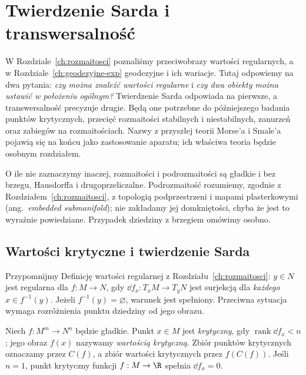 \chapter{Twierdzenie Sarda i transwersalność}
\label{ch:sard-transwersalnosc}

\providecommand{\atlasref}[2]{#2}

W Rozdziale~\ref{ch:rozmaitosci} poznaliśmy przeciwobrazy
wartości regularnych, a w Rozdziale~\ref{ch:geodezyjne-exp}
geodezyjne i ich wariacje. Tutaj odpowiemy na dwa pytania:
\emph{czy można znaleźć wartości regularne} i
\emph{czy dwa obiekty można ustawić w położeniu ogólnym?}
Twierdzenie Sarda odpowiada na pierwsze, a transwersalność
precyzuje drugie. Będą one potrzebne do późniejszego
badania punktów krytycznych, przecięć rozmaitości
stabilnych i niestabilnych, zanurzeń oraz zabiegów na
rozmaitościach. Nazwy z przyszłej teorii Morse'a i
Smale'a pojawią się na końcu jako zastosowanie aparatu;
ich właściwa teoria będzie osobnym rozdziałem.

O ile nie zaznaczymy inaczej, rozmaitości i podrozmaitości
są gładkie i bez brzegu, Hausdorffa i drugoprzeliczalne.
Podrozmaitość rozumiemy, zgodnie z Rozdziałem~\ref{ch:rozmaitosci},
z topologią podprzestrzeni i mapami plasterkowymi
(ang.\ \emph{embedded submanifold}); nie zakładamy jej
domkniętości, chyba że jest to wyraźnie powiedziane.
Przypadek dziedziny z brzegiem omówimy osobno.

\section{Wartości krytyczne i twierdzenie Sarda}
\label{sec:sard}

Przypomnijmy Definicję wartości regularnej z
Rozdziału~\ref{ch:rozmaitosci}: $y\in N$ jest regularna
dla $f:M\to N$, gdy $\dd f_x:T_xM\to T_yN$ jest
surjekcją dla \emph{każdego} $x\in f^{-1}(y)$.
Jeżeli $f^{-1}(y)=\varnothing$, warunek jest spełniony.
Przeciwna sytuacja wymaga rozróżnienia punktu dziedziny
od jego obrazu.

\begin{definicja}
\label{def:sard-krytyczne}
Niech $f:M^m\to N^n$ będzie gładkie.
Punkt $x\in M$ jest \emph{krytyczny}, gdy
$\operatorname{rank}\dd f_x<n$; jego obraz $f(x)$
nazywamy \emph{wartością krytyczną}. Zbiór punktów
krytycznych oznaczamy przez $C(f)$, a zbiór wartości
krytycznych przez $f(C(f))$. Jeśli $n=1$, punkt
krytyczny funkcji $f:M\to\R$ spełnia $\dd f_x=0$.
\end{definicja}

